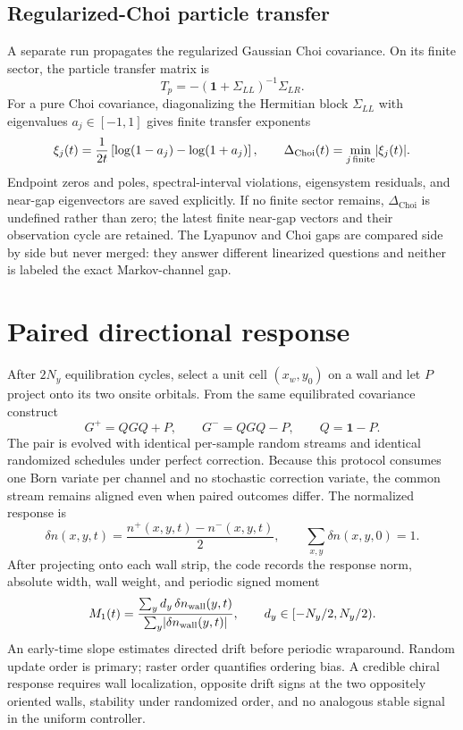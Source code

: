 \documentclass[aps,prb,onecolumn,nofootinbib,superscriptaddress]{revtex4-2}
\begin{document}
\subsection{Regularized-Choi particle transfer}

A separate run propagates the regularized Gaussian Choi covariance.  On its
finite sector, the particle transfer matrix is
\begin{equation}
 T_p=-(\mathbf{1}+\Sigma_{LL})^{-1}\Sigma_{LR}.
\end{equation}
For a pure Choi covariance, diagonalizing the Hermitian block
$\Sigma_{LL}$ with eigenvalues $a_j\in[-1,1]$ gives finite transfer exponents
\begin{equation}
 \xi_j(t)=\frac{1}{2t}
 \left[\log(1-a_j)-\log(1+a_j)\right],
 \qquad
 \Delta_{\mathrm{Choi}}(t)=\min_{j\,{\rm finite}}\lvert\xi_j(t)\rvert.
 \label{eq:choi}
\end{equation}
Endpoint zeros and poles, spectral-interval violations, eigensystem residuals,
and near-gap eigenvectors are saved explicitly.  If no finite sector remains,
$\Delta_{\mathrm{Choi}}$ is undefined rather than zero; the latest finite
near-gap vectors and their observation cycle are retained.  The Lyapunov and
Choi gaps
are compared side by side but never merged: they answer different linearized
questions and neither is labeled the exact Markov-channel gap.

\section{Paired directional response}

After $2N_y$ equilibration cycles, select a unit cell $(x_w,y_0)$ on a wall and
let $P$ project onto its two onsite orbitals.  From the same equilibrated
covariance construct
\begin{equation}
 G^+=QGQ+P,\qquad G^-=QGQ-P,\qquad Q=\mathbf{1}-P.
 \label{eq:reset}
\end{equation}
The pair is evolved with identical per-sample random streams and identical
randomized schedules under perfect correction.  Because this protocol consumes
one Born variate per channel and no stochastic correction variate, the common
stream remains aligned even when paired outcomes differ.  The normalized
response is
\begin{equation}
 \delta n(x,y,t)=\frac{n^+(x,y,t)-n^-(x,y,t)}{2},
 \qquad \sum_{x,y}\delta n(x,y,0)=1.
\end{equation}
After projecting onto each wall strip, the code records the response norm,
absolute width, wall weight, and periodic signed moment
\begin{equation}
 M_1(t)=\frac{\sum_y d_y\,\delta n_{\rm wall}(y,t)}
 {\sum_y\lvert\delta n_{\rm wall}(y,t)\rvert},
 \qquad d_y\in[-N_y/2,N_y/2).
 \label{eq:first-moment}
\end{equation}
An early-time slope estimates directed drift before periodic wraparound.
Random update order is primary; raster order quantifies ordering bias.  A
credible chiral response requires wall localization, opposite drift signs at
the two oppositely oriented walls, stability under randomized order, and no
analogous stable signal in the uniform controller.
\end{document}
